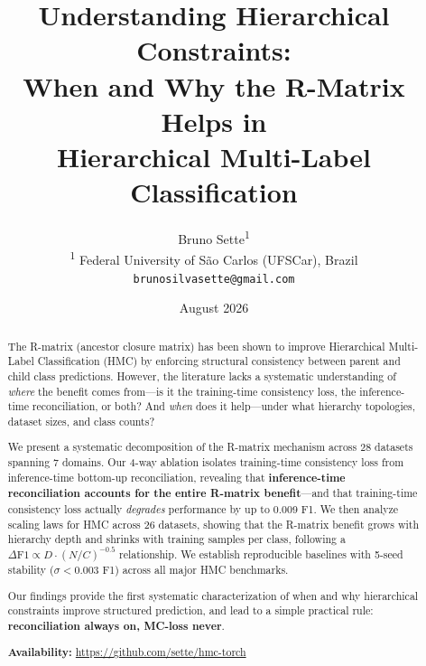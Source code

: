 \documentclass[11pt,a4paper]{article}
\title{\textbf{Understanding Hierarchical Constraints:\\
When and Why the R-Matrix Helps in\\
Hierarchical Multi-Label Classification}}
\author{
  Bruno Sette\textsuperscript{1} \\
  \textsuperscript{1} Federal University of São Carlos (UFSCar), Brazil \\
  \texttt{brunosilvasette@gmail.com}
}
\date{August 2026}
\begin{document}
\maketitle

\begin{abstract}
The R-matrix (ancestor closure matrix) has been shown to improve
Hierarchical Multi-Label Classification (HMC) by enforcing structural
consistency between parent and child class predictions. However, the
literature lacks a systematic understanding of \emph{where} the benefit
comes from---is it the training-time consistency loss, the inference-time
reconciliation, or both? And \emph{when} does it help---under what
hierarchy topologies, dataset sizes, and class counts?

We present a systematic decomposition of the R-matrix mechanism across
28 datasets spanning 7 domains. Our 4-way ablation isolates
training-time consistency loss from inference-time bottom-up
reconciliation, revealing that \textbf{inference-time reconciliation
accounts for the entire R-matrix benefit}---and that training-time
consistency loss actually \emph{degrades} performance by up to 0.009
F1. We then analyze scaling laws for HMC across 26 datasets, showing
that the R-matrix benefit grows with hierarchy depth and shrinks with
training samples per class, following a $\Delta\text{F1} \propto
D \cdot (N/C)^{-0.5}$ relationship. We establish reproducible baselines
with 5-seed stability ($\sigma < 0.003$ F1) across all major HMC
benchmarks.

Our findings provide the first systematic characterization of when and
why hierarchical constraints improve structured prediction, and lead
to a simple practical rule: \textbf{reconciliation always on, MC-loss
never}.

\smallskip
\noindent\textbf{Availability:} \url{https://github.com/sette/hmc-torch}
\end{abstract}









\end{document}
